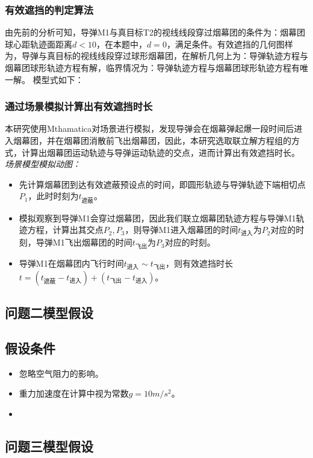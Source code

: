 \documentclass{article}
\begin{document}
\subsubsection{有效遮挡的判定算法}

由先前的分析可知，导弹M1与真目标T2的视线线段穿过烟幕团的条件为：烟幕团球心距轨迹面距离$d<10$，在本题中，$d = 0$，满足条件。有效遮挡的几何图样为，导弹与真目标的视线线段穿过球形烟幕团，在解析几何上为：导弹轨迹方程与烟幕团球形轨迹方程有解，临界情况为：导弹轨迹方程与烟幕团球形轨迹方程有唯一解。
模型式如下：
\subsubsection{通过场景模拟计算出有效遮挡时长}
本研究使用Mthamatica对场景进行模拟，发现导弹会在烟幕弹起爆一段时间后进入烟幕团，并在烟幕团消散前飞出烟幕团，因此，本研究选取联立解方程组的方式，计算出烟幕团运动轨迹与导弹运动轨迹的交点，进而计算出有效遮挡时长。
\textit{场景模型模拟动图：}

\begin{itemize}
    \item 先计算烟幕团到达有效遮蔽预设点的时间，即圆形轨迹与导弹轨迹下端相切点$P_1$，此时时刻为$t_\text{遮蔽}$。
    \item 模拟观察到导弹M1会穿过烟幕团，因此我们联立烟幕团轨迹方程与导弹M1轨迹方程，计算出其交点$P_2,P_3$，则导弹M1进入烟幕团的时间$t_{\text{进入}}$为$P_2$对应的时刻，导弹M1飞出烟幕团的时间$t_{\text{飞出}}$为$P_3$对应的时刻。
    \item 导弹M1在烟幕团内飞行时间$t_{\text{进入}} \sim t_{\text{飞出}}$，则有效遮挡时长$t =(t_\text{遮蔽}- t_\text{进入}) + (t_{\text{飞出}} - t_{\text{进入}})$。
\end{itemize}
\subsection{问题二模型假设}

\subsection{假设条件}
\begin{itemize}
    \item 忽略空气阻力的影响。
    \item 重力加速度在计算中视为常数$g = 10m/s^2$。
    \item 
\end{itemize}
\subsection{问题三模型假设}
\end{document}
